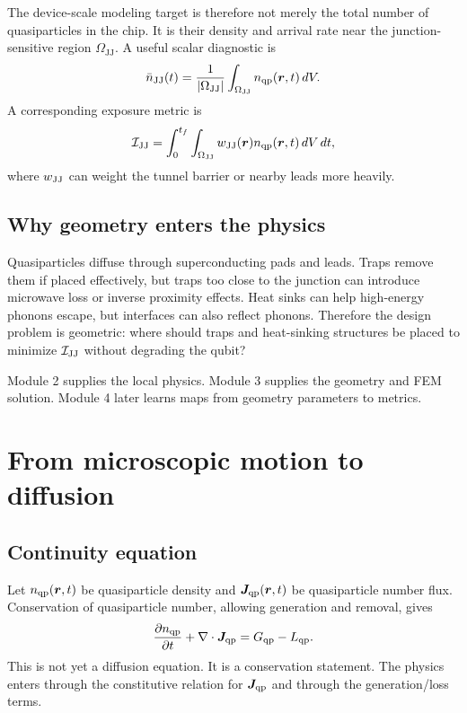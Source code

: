 \documentclass[11pt]{article}
\newcommand{\br}{{\bm{r}}}
\newcommand{\JJvol}{\Omega_{\mathrm{JJ}}}
\begin{document}
The device-scale modeling target is therefore not merely the total number of quasiparticles in the chip. It is their density and arrival rate near the junction-sensitive region $\JJvol$. A useful scalar diagnostic is
\begin{equation}
\bar n_{\JJ}(t)=\frac{1}{|\JJvol|}\int_{\JJvol}n_{\qp}(\br,t)\,dV.
\end{equation}
A corresponding exposure metric is
\begin{equation}
\mathcal{I}_{\JJ}=\int_0^{t_f}\int_{\JJvol}w_{\JJ}(\br)n_{\qp}(\br,t)\,dV\,dt,
\end{equation}
where $w_{\mathrm{JJ}}$ can weight the tunnel barrier or nearby leads more heavily.

\subsection{Why geometry enters the physics}
Quasiparticles diffuse through superconducting pads and leads. Traps remove them if placed effectively, but traps too close to the junction can introduce microwave loss or inverse proximity effects. Heat sinks can help high-energy phonons escape, but interfaces can also reflect phonons. Therefore the design problem is geometric: where should traps and heat-sinking structures be placed to minimize $\mathcal{I}_{\mathrm{JJ}}$ without degrading the qubit?

Module 2 supplies the local physics. Module 3 supplies the geometry and FEM solution. Module 4 later learns maps from geometry parameters to metrics.

\section{From microscopic motion to diffusion}

\subsection{Continuity equation}
Let $n_{\qp}(\br,t)$ be quasiparticle density and $\bm{J}_{\qp}(\br,t)$ be quasiparticle number flux. Conservation of quasiparticle number, allowing generation and removal, gives
\begin{equation}
\frac{\partial n_{\mathrm{qp}}}{\partial t}+\nabla\cdot\bm{J}_{\mathrm{qp}}=G_{\mathrm{qp}}-L_{\mathrm{qp}}.
\end{equation}
This is not yet a diffusion equation. It is a conservation statement. The physics enters through the constitutive relation for $\bm{J}_{\mathrm{qp}}$ and through the generation/loss terms.
\end{document}
